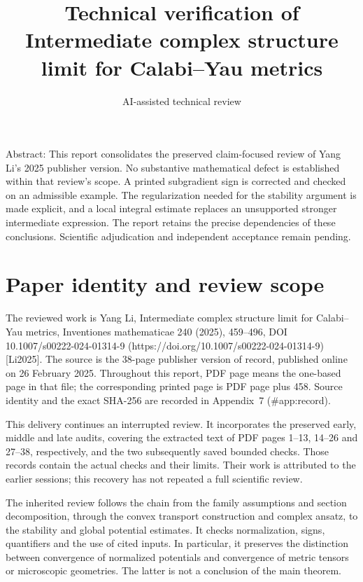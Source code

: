 \documentclass[10pt]{article}
\title{Technical verification of
Intermediate complex structure limit
for Calabi–Yau metrics}
\author{AI-assisted technical review}
\date{}
\begin{document}
\maketitle
Abstract: This report consolidates the preserved claim-focused review of Yang Li’s 2025 publisher version. No substantive mathematical defect is established within that review’s scope. A printed subgradient sign is corrected and checked on an admissible example. The regularization needed for the stability argument is made explicit, and a local integral estimate replaces an unsupported stronger intermediate expression. The report retains the precise dependencies of these conclusions. Scientific adjudication and independent acceptance remain pending.\par
\section*{Paper identity and review scope}
The reviewed work is Yang Li, Intermediate complex structure limit for Calabi–Yau metrics, Inventiones mathematicae 240 (2025), 459–496, DOI 10.1007/s00222-024-01314-9 (https://doi.org/10.1007/s00222-024-01314-9) [Li2025]. The source is the 38-page publisher version of record, published online on 26 February 2025. Throughout this report, PDF page means the one-based page in that file; the corresponding printed page is PDF page plus 458. Source identity and the exact SHA-256 are recorded in Appendix 7 (\#app:record).\par
This delivery continues an interrupted review. It incorporates the preserved early, middle and late audits, covering the extracted text of PDF pages 1–13, 14–26 and 27–38, respectively, and the two subsequently saved bounded checks. Those records contain the actual checks and their limits. Their work is attributed to the earlier sessions; this recovery has not repeated a full scientific review.\par
The inherited review follows the chain from the family assumptions and section decomposition, through the convex transport construction and complex ansatz, to the stability and global potential estimates. It checks normalization, signs, quantifiers and the use of cited inputs. In particular, it preserves the distinction between convergence of normalized potentials and convergence of metric tensors or microscopic geometries. The latter is not a conclusion of the main theorem.\par
\end{document}
